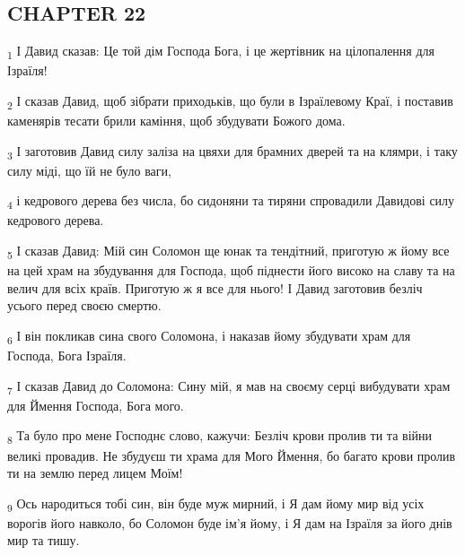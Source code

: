 \subsection{CHAPTER 22}
\begin{tcolorbox}
\textsubscript{1} І Давид сказав: Це той дім Господа Бога, і це жертівник на цілопалення для Ізраїля!
\end{tcolorbox}
\begin{tcolorbox}
\textsubscript{2} І сказав Давид, щоб зібрати приходьків, що були в Ізраїлевому Краї, і поставив каменярів тесати брили каміння, щоб збудувати Божого дома.
\end{tcolorbox}
\begin{tcolorbox}
\textsubscript{3} І заготовив Давид силу заліза на цвяхи для брамних дверей та на клямри, і таку силу міді, що їй не було ваги,
\end{tcolorbox}
\begin{tcolorbox}
\textsubscript{4} і кедрового дерева без числа, бо сидоняни та тиряни спровадили Давидові силу кедрового дерева.
\end{tcolorbox}
\begin{tcolorbox}
\textsubscript{5} І сказав Давид: Мій син Соломон ще юнак та тендітний, приготую ж йому все на цей храм на збудування для Господа, щоб піднести його високо на славу та на велич для всіх країв. Приготую ж я все для нього! І Давид заготовив безліч усього перед своєю смертю.
\end{tcolorbox}
\begin{tcolorbox}
\textsubscript{6} І він покликав сина свого Соломона, і наказав йому збудувати храм для Господа, Бога Ізраїля.
\end{tcolorbox}
\begin{tcolorbox}
\textsubscript{7} І сказав Давид до Соломона: Сину мій, я мав на своєму серці вибудувати храм для Ймення Господа, Бога мого.
\end{tcolorbox}
\begin{tcolorbox}
\textsubscript{8} Та було про мене Господнє слово, кажучи: Безліч крови пролив ти та війни великі провадив. Не збудуєш ти храма для Мого Ймення, бо багато крови пролив ти на землю перед лицем Моїм!
\end{tcolorbox}
\begin{tcolorbox}
\textsubscript{9} Ось народиться тобі син, він буде муж мирний, і Я дам йому мир від усіх ворогів його навколо, бо Соломон буде ім'я йому, і Я дам на Ізраїля за його днів мир та тишу.
\end{tcolorbox}
